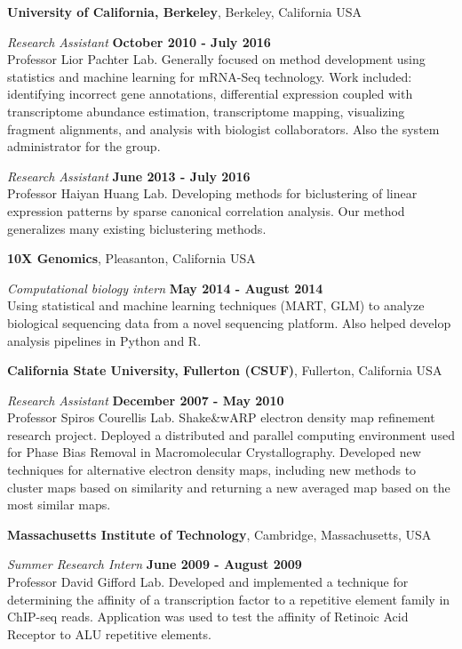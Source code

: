 \documentclass[overlapped]{res}
\begin{document}
\begin{resume}
{\bf University of California, Berkeley}, Berkeley, California USA
\vspace{-.3cm}

{\em Research Assistant} \hfill {\bf October 2010 - July 2016}\\
Professor Lior Pachter Lab.
Generally focused on method development using statistics and machine learning for mRNA-Seq technology.
Work included: identifying incorrect gene annotations, differential expression coupled with transcriptome abundance estimation, transcriptome mapping, visualizing fragment alignments, and analysis with biologist collaborators.
Also the system administrator for the group.

{\em Research Assistant} \hfill {\bf June 2013 - July 2016}\\
Professor Haiyan Huang Lab. Developing methods for biclustering of linear
expression patterns by sparse canonical correlation analysis. Our method
generalizes many existing biclustering methods.

\newpage

{\bf 10X Genomics}, Pleasanton, California USA
\vspace{-.3cm}

{\em Computational biology intern} \hfill {\bf May 2014 - August 2014}\\
Using statistical and machine learning techniques (MART, GLM) to analyze
biological sequencing data from a novel sequencing platform. Also helped
develop analysis pipelines in Python and R.

{\bf California State University, Fullerton (CSUF)}, Fullerton, California USA
\vspace{-.3cm}

{\em Research Assistant} \hfill {\bf December 2007 - May 2010}\\
Professor Spiros Courellis Lab. Shake\&wARP electron density map refinement
research project. Deployed a distributed and parallel computing environment used
for Phase Bias Removal in Macromolecular Crystallography. Developed new
techniques for alternative electron density maps, including new methods to
cluster maps based on similarity and returning a new averaged map based on the
most similar maps.


{\bf Massachusetts Institute of Technology}, Cambridge, Massachusetts,
USA

\vspace{-.3cm}
{\em Summer Research Intern} \hfill {\bf June 2009 - August 2009}\\
Professor David Gifford Lab. Developed and implemented a technique for
determining the affinity of a transcription factor to a repetitive element
family in ChIP-seq reads. Application was used to test the affinity of Retinoic
Acid Receptor to ALU repetitive elements.


\end{resume}
\end{document}

